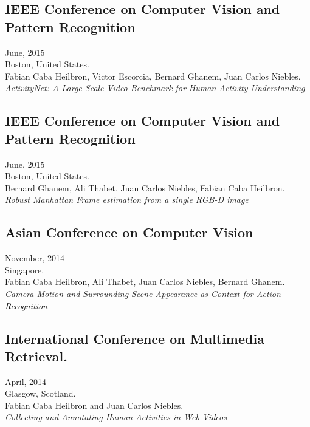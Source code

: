 \documentclass[letterpaper,10pt]{article}
\begin{document}
\subsection{IEEE Conference on Computer Vision and Pattern Recognition} \hfill June, 2015 \\ 
Boston, United States. \\
Fabian Caba Heilbron, Victor Escorcia, Bernard Ghanem, Juan Carlos Niebles. \\ \textit{ActivityNet: A Large-Scale Video Benchmark for Human Activity Understanding}

\subsection{IEEE Conference on Computer Vision and Pattern Recognition} \hfill June, 2015 \\ 
Boston, United States. \\
Bernard Ghanem, Ali Thabet, Juan Carlos Niebles, Fabian Caba Heilbron. \\
\textit{Robust Manhattan Frame estimation from a single RGB-D image}

\subsection{Asian Conference on Computer Vision} \hfill November, 2014 \\ 
Singapore. \\
Fabian Caba Heilbron, Ali Thabet, Juan Carlos Niebles, Bernard Ghanem. \\
\textit{Camera Motion and Surrounding Scene Appearance as Context for Action Recognition}

\subsection{International Conference on Multimedia Retrieval.} \hfill April, 2014 \\ 
Glasgow, Scotland. \\
Fabian Caba Heilbron and Juan Carlos Niebles. \\
\textit{Collecting and Annotating Human Activities in Web Videos}
\end{document}

